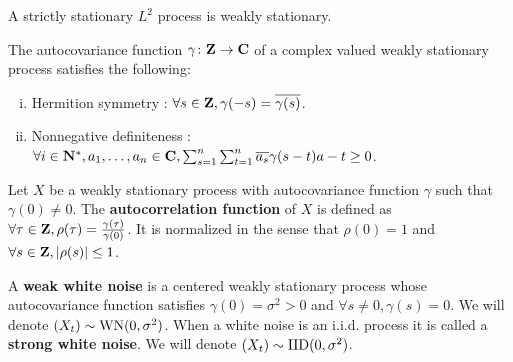 	A strictly stationary $L^2$ process is weakly stationary.

	\begin{pop}
		The autocovariance function $\gamma \colon \mathbf{Z} \to \mathbf{C}$ of a complex valued weakly stationary process satisfies the following:
		\begin{enumerate}[(i)]
			\item Hermition symmetry : $\forall s \in \mathbf{Z}, \gamma(-s) = \overline{\gamma(s)}$.
			\item Nonnegative definiteness : $\forall i \in \mathbf{N}^*, a_1, \ldots, a_n \in \mathbf{C}, \sum_{s = 1}^n \sum_{t = 1}^n \overline{a_s} \gamma(s - t) a-t \geq 0$.
		\end{enumerate}
	\end{pop}
	
	\begin{defn}
		Let $X$ be a weakly stationary process with autocovariance function $\gamma$ such that $\gamma(0) \neq 0$.
		The \textbf{autocorrelation function} of $X$ is defined as $\forall \tau \in \mathbf{Z}, \rho(\tau) = \frac{\gamma(\tau)}{\gamma(0)}$.
		It is normalized in the sense that $\rho(0) = 1$ and $\forall s \in \mathbf{Z}, \left\lvert\rho(s)\right\rvert \leq 1$.
	\end{defn}

	\begin{defn}
		A \textbf{weak white noise} is a centered weakly stationary process whose autocovariance function satisfies $\gamma(0) = \sigma^2 > 0$ and $\forall s \neq 0, \gamma(s) = 0$.
		We will denote $(X_t) \sim \operatorname{WN}(0,\sigma^2)$.
		When a white noise is an i.i.d. process it is called a \textbf{strong white noise}.
		We will denote $(X_t) \sim \operatorname{IID}(0,\sigma^2)$.
	\end{defn}
